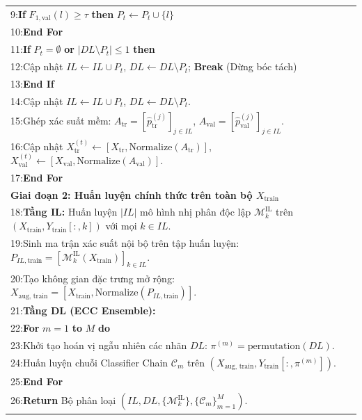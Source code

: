 \documentclass[11pt,a4paper]{article}
\begin{document}
\begin{table}[H]
\begin{tabular}{p{}}
9:\quad\quad\quad \textbf{If} $F_{1, \text{val}}(l) \ge \tau$ \textbf{then} $P_t \leftarrow P_t \cup \{l\}$ \\
10:\quad\quad \textbf{End For} \\
11:\quad\quad \textbf{If} $P_t = \emptyset$ \textbf{or} $|DL \setminus P_t| \le 1$ \textbf{then} \\
12:\quad\quad\quad Cập nhật $IL \leftarrow IL \cup P_t$, $DL \leftarrow DL \setminus P_t$; \textbf{Break} (Dừng bóc tách) \\
13:\quad\quad \textbf{End If} \\
14:\quad\quad Cập nhật $IL \leftarrow IL \cup P_t$, $DL \leftarrow DL \setminus P_t$. \\
15:\quad\quad Ghép xác suất mềm: $A_{\text{tr}} = [\hat{p}_{\text{tr}}^{(j)}]_{j \in IL}$, $A_{\text{val}} = [\hat{p}_{\text{val}}^{(j)}]_{j \in IL}$. \\
16:\quad\quad Cập nhật $X_{\text{tr}}^{(t)} \leftarrow [X_{\text{tr}}, \text{Normalize}(A_{\text{tr}})]$, $X_{\text{val}}^{(t)} \leftarrow [X_{\text{val}}, \text{Normalize}(A_{\text{val}})]$. \\
17:\quad \textbf{End For} \\
\addlinespace
\textbf{Giai đoạn 2: Huấn luyện chính thức trên toàn bộ $X_{\text{train}}$} \\
18:\quad \textbf{Tầng IL:} Huấn luyện $|IL|$ mô hình nhị phân độc lập $\mathcal{M}_k^{\text{IL}}$ trên $(X_{\text{train}}, Y_{\text{train}}[:, k])$ với mọi $k \in IL$. \\
19:\quad Sinh ma trận xác suất nội bộ trên tập huấn luyện: $P_{IL, \text{train}} = [\mathcal{M}_k^{\text{IL}}(X_{\text{train}})]_{k \in IL}$. \\
20:\quad Tạo không gian đặc trưng mở rộng: $X_{\text{aug, train}} = [X_{\text{train}}, \text{Normalize}(P_{IL, \text{train}})]$. \\
21:\quad \textbf{Tầng DL (ECC Ensemble):} \\
22:\quad \textbf{For} $m = 1$ \textbf{to} $M$ \textbf{do} \\
23:\quad\quad Khởi tạo hoán vị ngẫu nhiên các nhãn $DL$: $\pi^{(m)} = \text{permutation}(DL)$. \\
24:\quad\quad Huấn luyện chuỗi Classifier Chain $\mathcal{C}_m$ trên $(X_{\text{aug, train}}, Y_{\text{train}}[:, \pi^{(m)}])$. \\
25:\quad \textbf{End For} \\
26:\quad \textbf{Return} Bộ phân loại $(IL, DL, \{\mathcal{M}_k^{\text{IL}}\}, \{\mathcal{C}_m\}_{m=1}^M)$. \\
\bottomrule
\end{tabular}
\end{table}
\end{document}
